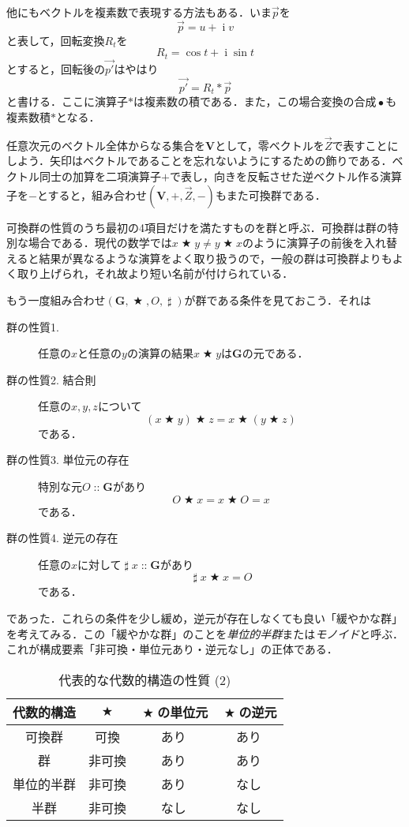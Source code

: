 \documentclass[twocolumn]{jsbook}
\newcommand{\keyword}[1]{{\emph{#1}}}
\DeclareMathOperator{\mathAnyBinaryOperator}{\bigstar}
\DeclareMathOperator{\mathInverse}{\sharp}
\DeclareMathOperator{\mathCompose}{\bullet}
\DeclareMathOperator{\mathI}{i}
\DeclareMathOperator{\mathIn}{::}
\newcommand{\mathSet}[1]{\mathbf{#1}}
\newcommand{\mathVector}[1]{\vec{#1}}
\newcommand{\mathGroup}[4]{(#1,#2,#3,#4)}
\begin{document}
他にもベクトルを複素数で表現する方法もある．いま$\mathVector{p}$を$$\mathVector{p}=u+\mathI v$$と表して，回転変換$R_t$を$$R_t=\cos t+\mathI\sin t$$とすると，回転後の$\mathVector{p'}$はやはり$$\mathVector{p'}=R_t*\mathVector{p}$$と書ける．ここに演算子$*$は複素数の積である．また，この場合変換の合成$\mathCompose$も複素数積$*$となる．

任意次元のベクトル全体からなる集合を$\mathSet{V}$として，零ベクトルを$\mathVector{Z}$で表すことにしよう．矢印はベクトルであることを忘れないようにするための飾りである．ベクトル同士の加算を二項演算子$+$で表し，向きを反転させた逆ベクトル作る演算子を$-$とすると，組み合わせ$\mathGroup{\mathSet{V}}{+}{\mathVector{Z}}{-}$もまた可換群である．

可換群の性質のうち最初の4項目だけを満たすものを群と呼ぶ．可換群は群の特別な場合である．現代の数学では$x\mathAnyBinaryOperator y\neq y\mathAnyBinaryOperator x$のように演算子の前後を入れ替えると結果が異なるような演算をよく取り扱うので，一般の群は可換群よりもよく取り上げられ，それ故より短い名前が付けられている．

もう一度組み合わせ$\mathGroup{\mathSet{G}}{\mathAnyBinaryOperator}{O}{\mathInverse}$が群である条件を見ておこう．それは
\begin{description}
\item[群の性質1.] 任意の$x$と任意の$y$の演算の結果$x\mathAnyBinaryOperator y$は$\mathSet{G}$の元である．
\item[群の性質2. 結合則] 任意の$x,y,z$について$$(x\mathAnyBinaryOperator y)\mathAnyBinaryOperator z=x\mathAnyBinaryOperator(y\mathAnyBinaryOperator z)$$である．
\item[群の性質3. 単位元の存在] 特別な元$O\mathIn\mathSet{G}$があり$$O\mathAnyBinaryOperator x=x\mathAnyBinaryOperator O=x$$である．
\item[群の性質4. 逆元の存在] 任意の$x$に対して$\mathInverse x\mathIn\mathSet{G}$があり$$\mathInverse x\mathAnyBinaryOperator x=O$$である．
\end{description}
であった．これらの条件を少し緩め，逆元が存在しなくても良い「緩やかな群」を考えてみる．この「緩やかな群」のことを\keyword{単位的半群}または\keyword{モノイド}と呼ぶ．これが構成要素「非可換・単位元あり・逆元なし」の正体である．

\begin{table}
\caption{代表的な代数的構造の性質 (2)}
\label{tab:group-and-monoid}
\begin{center}
\begin{tabular}{||c||c|c|c||}
\hline
代数的構造&$\mathAnyBinaryOperator$&$\mathAnyBinaryOperator$の単位元&$\mathAnyBinaryOperator$の逆元\\
\hline\hline
可換群&可換&あり&あり\\
群&非可換&あり&あり\\
単位的半群&非可換&あり&なし\\
半群&非可換&なし&なし\\
\hline
\end{tabular}
\end{center}
\end{table}
\end{document}

